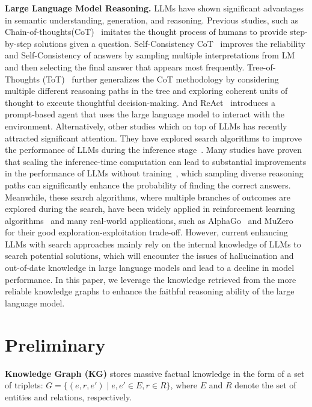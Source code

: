 \documentclass[lettersize,journal]{IEEEtran}
\begin{document}
\textbf{Large Language Model Reasoning.} LLMs have shown significant advantages in semantic understanding, generation, and reasoning. Previous studies, such as Chain-of-thoughts(CoT)~\cite{wei2022chain} imitates the thought process of humans to provide step-by-step solutions given a question. Self-Consistency CoT~\cite{wang2022self} improves the reliability and Self-Consistency of answers by sampling multiple interpretations from LM and then selecting the final answer that appears most frequently. Tree-of-Thoughts (ToT)~\cite{yao2023tree} further generalizes the CoT methodology by considering multiple different reasoning paths in the tree and exploring coherent units of thought to execute thoughtful decision-making. And ReAct~\cite{yao2023react} introduces a prompt-based agent that uses the large language model to interact with the environment.
Alternatively, other studies which on top of LLMs has recently attracted significant attention. They have explored search algorithms to improve the performance of LLMs during the inference stage~\cite{wang2024q, qi2024mutual, zhang2024llama}. Many studies have proven that scaling the inference-time computation can lead to substantial improvements in the performance of LLMs without training~\cite{brown2024large, snell2024scaling, zhang2024rest}, which sampling diverse reasoning paths can significantly enhance the probability of finding the correct answers. 
Meanwhile, these search algorithms, where multiple branches of outcomes are explored during the search, have been widely applied in reinforcement learning algorithms~\cite{silver2017mastering} and many real-world applications, such as AlphaGo~\cite{silver2016mastering} and MuZero~\cite{schrittwieser2020mastering} for their good exploration-exploitation trade-off. However, current enhancing LLMs with search approaches mainly rely on the internal knowledge of LLMs to search potential solutions, which will encounter the issues of hallucination and out-of-date knowledge in large language models and lead to a decline in model performance. 
In this paper, we leverage the knowledge retrieved from the more reliable knowledge graphs to enhance the faithful reasoning ability of the large language model.


\section{Preliminary}

\textbf{Knowledge Graph (KG)} stores massive factual knowledge in the form of a set of triplets: $G=\{(e, r, e') \mid e, e' \in E, r \in R \}$, where $E$ and $R$ denote the set of entities and relations, respectively.
\end{document}
